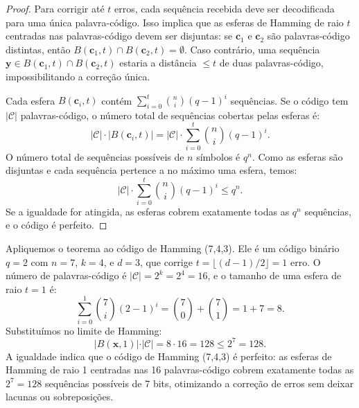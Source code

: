 \begin{proof}
Para corrigir até $t$ erros, cada sequência recebida deve ser decodificada para
uma única palavra-código. Isso implica que as esferas de Hamming de raio $t$
centradas nas palavras-código devem ser disjuntas: se $\mathbf{c}_1$ e
$\mathbf{c}_2$ são palavras-código distintas, então 
$B(\mathbf{c}_1, t) \cap B(\mathbf{c}_2, t) = \emptyset$. 
Caso contrário, uma sequência $\mathbf{y} \in B(\mathbf{c}_1, t) \cap B(\mathbf{c}_2, t)$
estaria a distância $\leq t$ de duas palavras-código, impossibilitando a correção única.

Cada esfera $B(\mathbf{c}_i, t)$  contém $\sum_{i=0}^{t} \binom{n}{i} (q-1)^i$ sequências.
Se o código tem $\vert \mathcal{C} \vert$ palavras-código, 
o número total de sequências cobertas pelas esferas é:
\begin{equation}
\vert \mathcal{C} \vert \cdot |B(\mathbf{c}_i, t)| = \vert \mathcal{C} \vert \cdot \sum_{i=0}^{t} \binom{n}{i} (q-1)^i.
\end{equation}
O número total de sequências possíveis de $n$ símbolos é $q^n$. 
Como as esferas são disjuntas e cada sequência pertence a no máximo uma esfera, temos:
\begin{equation} 
\vert \mathcal{C} \vert \cdot \sum_{i=0}^{t} \binom{n}{i} (q-1)^i \leq q^n.
\end{equation}
Se a igualdade for atingida, as esferas cobrem exatamente todas as $q^n$ sequências, e o código é perfeito.
\end{proof}

Apliquemos o teorema ao código de Hamming (7,4,3). 
Ele é um código binário $q = 2$ com $n = 7$, $k = 4$, e $d = 3$, 
que corrige $t = \lfloor (d-1)/2 \rfloor = 1$ erro. 
O número de palavras-código é $\vert \mathcal{C} \vert = 2^k = 2^4 = 16$, 
e o tamanho de uma esfera de raio $t = 1$ é:
\begin{equation}
\sum_{i=0}^{1} \binom{7}{i} (2-1)^i = \binom{7}{0} + \binom{7}{1} = 1 + 7 = 8.
\end{equation}
Substituímos no limite de Hamming:
\begin{equation}
|B(\mathbf{x}, 1)| \cdot \vert \mathcal{C} \vert = 8 \cdot 16 = 128 \leq 2^7 = 128.
\end{equation}
A igualdade indica que o código de Hamming (7,4,3) é perfeito: 
as esferas de Hamming de raio 1 centradas nas 16 palavras-código cobrem exatamente 
todas as $2^7 = 128$ sequências possíveis de 7 bits, otimizando a correção de erros
sem deixar lacunas ou sobreposições.


